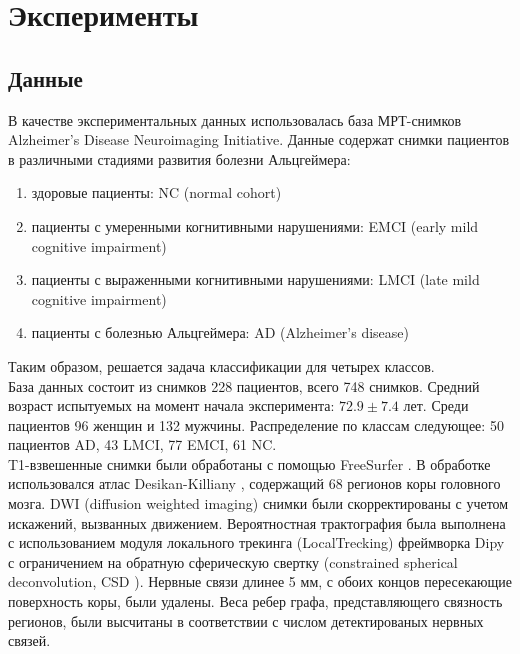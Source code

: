 \chapter{Эксперименты}

\section{Данные}
\indent В качестве экспериментальных данных использовалась база МРТ-снимков Alzheimer's Disease Neuroimaging Initiative. Данные содержат снимки пациентов в различными стадиями развития болезни Альцгеймера: 
\begin{enumerate}
    \item здоровые пациенты: NC (normal cohort)
    \item пациенты с умеренными когнитивными нарушениями: EMCI (early mild cognitive impairment)
    \item пациенты с выраженными когнитивными нарушениями: LMCI (late mild cognitive impairment)
    \item пациенты с болезнью Альцгеймера: AD (Alzheimer's disease)
\end{enumerate}

\indent Таким образом, решается задача классификации для четырех классов. \\
База данных состоит из снимков 228 пациентов, всего 748 снимков. Средний возраст испытуемых на момент начала эксперимента: $72.9 \pm 7.4$ лет. Среди пациентов 96 женщин и 132 мужчины. Распределение по классам следующее: 50 пациентов AD, 43 LMCI, 77 EMCI, 61 NC. \\
\indent T1-взвешенные снимки были обработаны с помощью FreeSurfer \cite{fischl2012freesurfer}. В обработке использовался атлас Desikan-Killiany \cite{desikan2006automated}, содержащий 68 регионов коры головного мозга. DWI (diffusion weighted imaging) снимки были скорректированы с учетом искажений, вызванных движением. Вероятностная трактография была выполнена с использованием модуля локального трекинга (LocalTrecking) фреймворка Dipy \cite{garyfallidis2014dipy} с ограничением на обратную сферическую свертку (constrained spherical deconvolution, CSD \cite{tax2014recursive}). Нервные связи длинее 5 мм, с обоих концов пересекающие поверхность коры, были удалены. Веса ребер графа, представляющего связность регионов, были высчитаны в соответствии с числом детектированых нервных связей.

